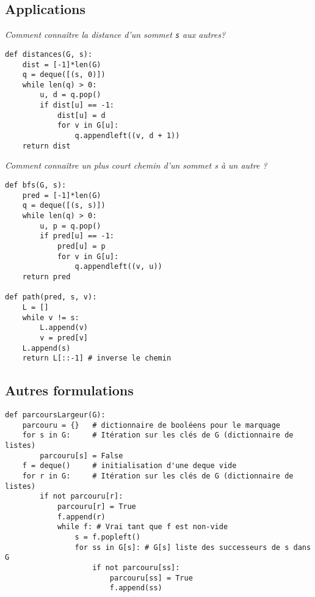 \subsection{Applications}
\begin{exemple}
\textit{Comment connaître la distance d'un sommet \texttt{s} aux autres?}
\ifprof
\begin{lstlisting}
def distances(G, s):
    dist = [-1]*len(G)
    q = deque([(s, 0)])
    while len(q) > 0:
        u, d = q.pop()
        if dist[u] == -1:
            dist[u] = d
            for v in G[u]:
                q.appendleft((v, d + 1))
    return dist
\end{lstlisting}
\else
\vspace{5cm}
\fi
\end{exemple}

\begin{exemple}
\textit{Comment connaître un plus court chemin d’un sommet s à un autre ? }
\ifprof
\begin{lstlisting}
def bfs(G, s):
    pred = [-1]*len(G)
    q = deque([(s, s)])
    while len(q) > 0:
        u, p = q.pop()
        if pred[u] == -1:
            pred[u] = p
            for v in G[u]:
                q.appendleft((v, u))
    return pred
    
def path(pred, s, v):
    L = []
    while v != s:
        L.append(v)
        v = pred[v]
    L.append(s)
    return L[::-1] # inverse le chemin
\end{lstlisting}
\else
\vspace{10cm}
\fi
\end{exemple}

\subsection{Autres formulations}

\begin{lstlisting}
def parcoursLargeur(G):
    parcouru = {}   # dictionnaire de booléens pour le marquage
    for s in G:     # Itération sur les clés de G (dictionnaire de listes)
        parcouru[s] = False
    f = deque()     # initialisation d'une deque vide
    for r in G:     # Itération sur les clés de G (dictionnaire de listes)
        if not parcouru[r]:
            parcouru[r] = True
            f.append(r)
            while f: # Vrai tant que f est non-vide
                s = f.popleft()
                for ss in G[s]: # G[s] liste des successeurs de s dans G
                    if not parcouru[ss]:
                        parcouru[ss] = True
                        f.append(ss)
\end{lstlisting}


